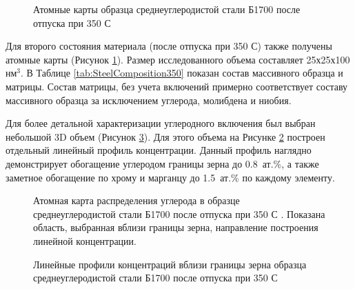 \begin{figure}[htb]
	\caption{Атомные карты образца среднеуглеродистой стали Б1700 после отпуска при 350 \textdegree С \cite{scbibRyabov}}
	\label{fig:SteelAtomMaps2}
\end{figure}

Для второго состояния материала (после отпуска при 350 \textdegree С) также получены атомные карты (Рисунок \cref{fig:SteelAtomMaps2}). Размер исследованного объема составляет 25х25х100 нм$^{3}$. В Таблице \cref{tab:SteelComposition350} показан состав массивного образца и матрицы. Состав матрицы, без учета включений примерно соответствует составу массивного образца за исключением углерода, молибдена и ниобия. 

Для более детальной характеризации углеродного включения был выбран небольшой 3D объем (Рисунок \cref{fig:SteelLinear2}). Для этого объема на Рисунке \cref{fig:SteelAtomMapsLin} построен отдельный линейный профиль концентрации.  Данный профиль наглядно демонстрирует обогащение углеродом границы зерна до 0.8~ат.\%, а также заметное обогащение по хрому и марганцу до 1.5~ат.\% по каждому элементу.

\begin{figure}[htb]
	\caption{Атомная карта распределения углерода в образце среднеуглеродистой стали Б1700 после отпуска при 350 \textdegree С \cite{scbibRyabov}. Показана область, выбранная вблизи границы зерна,  направление построения линейной концентрации.}
	\label{fig:SteelAtomMapsLin}
\end{figure}

\begin{figure}[htb]
	\caption{Линейные профили концентраций вблизи границы зерна образца среднеуглеродистой стали Б1700 после отпуска при 350 \textdegree С \cite{scbibRyabov}}
	\label{fig:SteelLinear2}
\end{figure}

